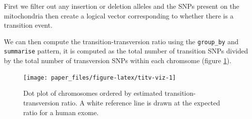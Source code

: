 \documentclass[10pt,letterpaper]{article}
\newenvironment{Shaded}{\begin{snugshade}}{\end{snugshade}}
\newcommand{\KeywordTok}[1]{\textcolor[rgb]{0.13,0.29,0.53}{\textbf{#1}}}
\newcommand{\DataTypeTok}[1]{\textcolor[rgb]{0.13,0.29,0.53}{#1}}
\newcommand{\StringTok}[1]{\textcolor[rgb]{0.31,0.60,0.02}{#1}}
\newcommand{\OperatorTok}[1]{\textcolor[rgb]{0.81,0.36,0.00}{\textbf{#1}}}
\newcommand{\NormalTok}[1]{#1}
\begin{document}
First we filter out any insertion or deletion alleles and the SNPs
present on the mitochondria then create a logical vector corresponding
to whether there is a transition event.

\begin{Shaded}
\end{Shaded}

We can then compute the transition-transversion ratio using the
\texttt{group\_by} and \texttt{summarise} pattern, it is computed as the
total number of transition SNPs divided by the total number of
transversion SNPs within each chromsome (figure \ref{fig:titv-viz}).

\begin{Shaded}
\end{Shaded}

\begin{figure}

{\centering \texttt{[image: paper\_files/figure-latex/titv-viz-1]} 

}

\caption{Dot plot of chromosomes ordered by estimated transition-transversion ratio. A white reference line is drawn at the expected ratio for a human exome.}\label{fig:titv-viz}
\end{figure}
\end{document}
